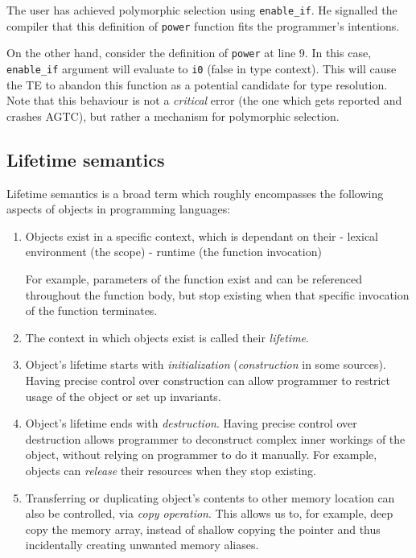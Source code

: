 \documentclass[times, utf8, diplomski]{fer}
\theoremstyle{definition}
\begin{document}
The user has achieved polymorphic selection using \texttt{enable\_if}. 
He signalled the compiler that this
definition of \texttt{power} function fits the programmer's intentions.

On the other hand, consider the definition of \texttt{power} at line 9.
In this case, \texttt{enable\_if} argument will evaluate to \texttt{i0} (false in type context).
This will cause the TE to abandon this function as a potential candidate for type resolution.
Note that this behaviour is not a \textit{critical} error (the one which gets reported and crashes AGTC),
but rather a mechanism for polymorphic selection.

\subsection{Lifetime semantics}

Lifetime semantics is a broad term which roughly encompasses the following aspects of objects
in programming languages:

\begin{enumerate}
    \item Objects exist in a specific context, which is dependant on their 
        \subitem - lexical environment (the scope)
        \subitem - runtime (the function invocation)

        For example, parameters of the function exist and can be referenced throughout the function body,
        but stop existing when that specific invocation of the function terminates. 

    \item The context in which objects exist is called their \textit{lifetime}.
    \item Object's lifetime starts with \textit{initialization} (\textit{construction} in some sources).
        Having precise control over construction can allow programmer
                to restrict usage of the object or set up invariants.
    \item Object's lifetime ends with \textit{destruction}.
        Having precise control over destruction allows programmer to
        deconstruct complex inner workings of the object, without relying on programmer to do it manually.
        For example, objects can \textit{release} their resources when they stop existing.
    \item Transferring or duplicating object's contents to other memory location can also be controlled,
        via \textit{copy operation}. This allows us to, for example, deep copy the memory array, 
        instead of shallow copying the pointer and thus incidentally creating unwanted memory aliases.
\end{enumerate}
\end{document}
